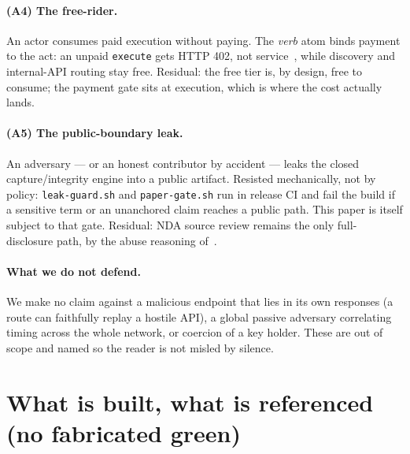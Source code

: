 \documentclass[11pt]{article}
\begin{document}
\paragraph{(A4) The free-rider.} An actor consumes paid execution without paying.
The \emph{verb} atom binds payment to the act: an unpaid \texttt{execute} gets HTTP
402, not service~\cite{x402}, while discovery and internal-API routing stay free.
Residual: the free tier is, by design, free to consume; the payment gate sits at
execution, which is where the cost actually lands.

\paragraph{(A5) The public-boundary leak.} An adversary --- or an honest
contributor by accident --- leaks the closed capture/integrity engine into a public
artifact. Resisted mechanically, not by policy: \texttt{leak-guard.sh} and
\texttt{paper-gate.sh} run in release CI and fail the build if a sensitive term or
an unanchored claim reaches a public path. This paper is itself subject to that
gate. Residual: NDA source review remains the only full-disclosure path, by the
abuse reasoning of~\cite{ossnotice}.

\paragraph{What we do not defend.} We make no claim against a malicious endpoint
that lies in its own responses (a route can faithfully replay a hostile API), a
global passive adversary correlating timing across the whole network, or coercion of
a key holder. These are out of scope and named so the reader is not misled by
silence.

\section{What is built, what is referenced (no fabricated green)}
\end{document}
